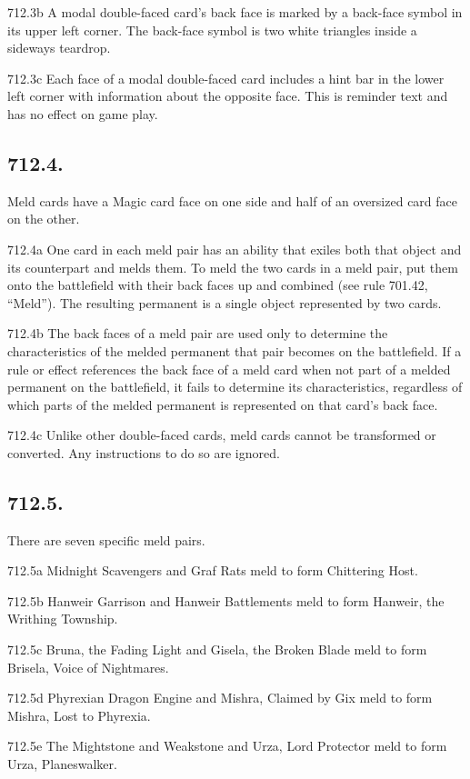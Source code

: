 712.3b A modal double-faced card’s back face is marked by a back-face symbol in its upper left corner. The back-face symbol is two white triangles inside a sideways teardrop.

712.3c Each face of a modal double-faced card includes a hint bar in the lower left corner with information about the opposite face. This is reminder text and has no effect on game play.

\subsection*{712.4.}
Meld cards have a Magic card face on one side and half of an oversized card face on the other.

712.4a One card in each meld pair has an ability that exiles both that object and its counterpart and melds them. To meld the two cards in a meld pair, put them onto the battlefield with their back faces up and combined (see rule 701.42, “Meld”). The resulting permanent is a single object represented by two cards.

712.4b The back faces of a meld pair are used only to determine the characteristics of the melded permanent that pair becomes on the battlefield. If a rule or effect references the back face of a meld card when not part of a melded permanent on the battlefield, it fails to determine its characteristics, regardless of which parts of the melded permanent is represented on that card’s back face.

712.4c Unlike other double-faced cards, meld cards cannot be transformed or converted. Any instructions to do so are ignored.

\subsection*{712.5.}
There are seven specific meld pairs.

712.5a Midnight Scavengers and Graf Rats meld to form Chittering Host.

712.5b Hanweir Garrison and Hanweir Battlements meld to form Hanweir, the Writhing Township.

712.5c Bruna, the Fading Light and Gisela, the Broken Blade meld to form Brisela, Voice of Nightmares.

712.5d Phyrexian Dragon Engine and Mishra, Claimed by Gix meld to form Mishra, Lost to Phyrexia.

712.5e The Mightstone and Weakstone and Urza, Lord Protector meld to form Urza, Planeswalker.

